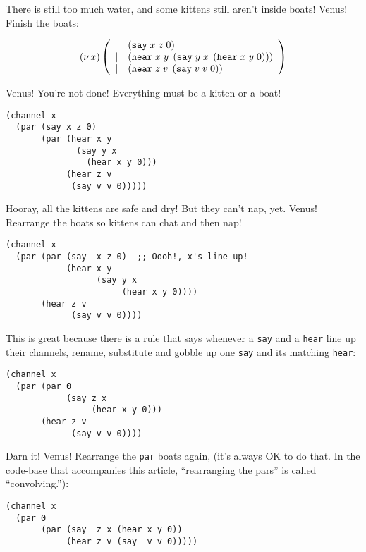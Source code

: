 \documentclass[10pt,oneside,x11names]{article}
\newcommand\napping    [0]{0}
\newcommand\whispering [2]{(\nu\,#1)\,{#2}}
\theoremstyle{definition}
\theoremstyle{warning}
\newcommand\say [3]{\left(\texttt{say}\thickspace{}#1\thickspace{}#2\thickspace{}#3\right)}
\newcommand\hear[3]{\left(\texttt{hear}\thickspace{}#1\thickspace{}#2\thickspace{}#3\right)}
\newcommand\kitA{\say{x}{z}{\napping}}
\newcommand\kitB{\hear{x}{y}{\say{y}{x}{\hear{x}{y}{\napping}}}}
\newcommand\kitC{\hear{z}{v}{\say{v}{v}{\napping}}}
\begin{document}
There is still too much water, and some kittens
still aren't inside boats! Venus! Finish the boats:

\begin{equation}
\whispering{x}{\left(
\begin{array}{clll}
 {}     & \kitA \\
 \vert  & \kitB \\
 \vert  & \kitC \\
\end{array}\right)}
\end{equation}

Venus! You're not done! Everything must be a kitten or a boat!

\vskip 0.26cm
\begin{verbatim}
(channel x
  (par (say x z 0)
       (par (hear x y
              (say y x
                (hear x y 0)))
            (hear z v
             (say v v 0)))))
\end{verbatim}

Hooray, all the kittens are safe and dry! But they can't nap, yet.
Venus! Rearrange the boats so kittens can chat and then nap!

\vskip 0.26cm
\begin{verbatim}
(channel x
  (par (par (say  x z 0)  ;; Oooh!, x's line up!
            (hear x y
                  (say y x
                       (hear x y 0))))
       (hear z v
             (say v v 0))))
\end{verbatim}

This is great because there is a rule that says whenever a
\texttt{say} and a \texttt{hear} line up their channels, rename, substitute
and gobble up one \texttt{say} and its matching \texttt{hear}:

\vskip 0.26cm
\begin{verbatim}
(channel x
  (par (par 0
            (say z x
                 (hear x y 0)))
       (hear z v
             (say v v 0))))
\end{verbatim}

Darn it! Venus! Rearrange the \texttt{par} boats again, (it's always OK
to do that. In the code-base that accompanies this article,
``rearranging the pars'' is called ``convolving.''):

\vskip 0.26cm
\begin{verbatim}
(channel x
  (par 0
       (par (say  z x (hear x y 0))
            (hear z v (say  v v 0)))))
\end{verbatim}
\end{document}
